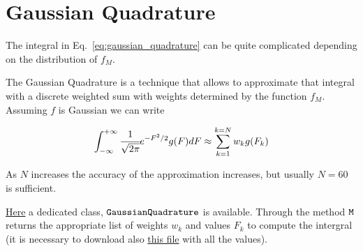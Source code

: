 \chapter{Gaussian Quadrature}\label{gaussian-quadrature}

The integral in Eq.~\ref{eq:gaussian_quadrature} can be quite
complicated depending on the distribution of \(f_M\).

The Gaussian Quadrature is a technique that allows to approximate that
integral with a discrete weighted sum with weights determined by the
function \(f_M\). Assuming \(f\) is Gaussian we can write

\[\int_{-\infty}^{+\infty}\cfrac{1}{\sqrt{2\pi}}e^{-F^{2}/2}g(F)dF\approx\sum_{k=1}^{k=N}w_k g(F_k)\]

As \(N\) increases the accuracy of the approximation increases, but usually
\(N=60\) is sufficient.

\href{https://drive.google.com/file/d/1Ic20cgVx4dpDG4W_pIHR4EXq9ens1G-H/view?usp=sharing}{Here} a dedicated class, \(\tt{GaussianQuadrature}\) is
available. Through the method \(\tt{M}\) returns the appropriate list of
weights \(w_k\) and values \(F_k\) to compute the intergral (it is
necessary to download also \href{https://drive.google.com/file/d/1zpQ0ubbEzniJb9usMWeeMCc0DSc2MGsC/view?usp=sharing}{this file} with all the values).

